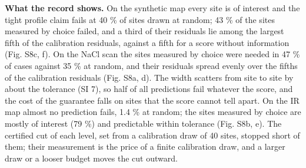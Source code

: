 \documentclass{iopjournal}
\begin{document}
\textbf{What the record shows.} On the synthetic map every site is of interest and the tight profile claim fails at 40 \% of sites drawn at random; 43 \% of the sites measured by choice failed, and a third of their residuals lie among the largest fifth of the calibration residuals, against a fifth for a score without information (Fig. S8c, f). On the NaCl scan the sites measured by choice were needed in 47 \% of cases against 35 \% at random, and their residuals spread evenly over the fifths of the calibration residuals (Fig. S8a, d). The width scatters from site to site by about the tolerance (SI 7), so half of all predictions fail whatever the score, and the cost of the guarantee falls on sites that the score cannot tell apart. On the IR map almost no prediction fails, 1.4 \% at random; the sites measured by choice are mostly of interest (79 \%) and predictable within tolerance (Fig. S8b, e). The certified cut of each level, set from a calibration draw of 40 sites, stopped short of them; their measurement is the price of a finite calibration draw, and a larger draw or a looser budget moves the cut outward.
\end{document}
